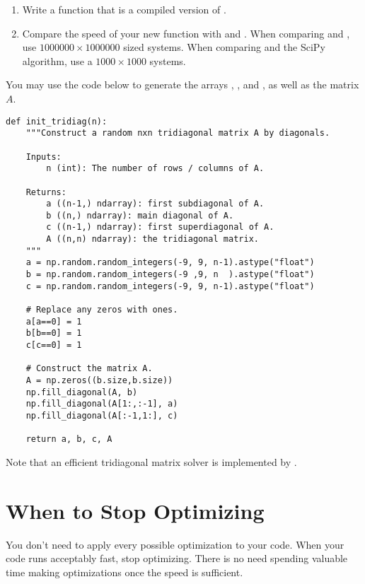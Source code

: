 \begin{problem} \label{prob:tridiag}
\leavevmode
\begin{enumerate}
\item Write a function that is a compiled version of .
\item Compare the speed of your new function with  and .
When comparing  and , use $1000000 \times 1000000$ sized systems.
When comparing  and the SciPy algorithm, use a $1000 \times 1000$ systems.
\end{enumerate}
You may use the code below to generate the arrays , , and , as well as the matrix $A$.

\begin{lstlisting}
def init_tridiag(n):
    """Construct a random nxn tridiagonal matrix A by diagonals.

    Inputs:
        n (int): The number of rows / columns of A.

    Returns:
        a ((n-1,) ndarray): first subdiagonal of A.
        b ((n,) ndarray): main diagonal of A.
        c ((n-1,) ndarray): first superdiagonal of A.
        A ((n,n) ndarray): the tridiagonal matrix.
    """
    a = np.random.random_integers(-9, 9, n-1).astype("float")
    b = np.random.random_integers(-9 ,9, n  ).astype("float")
    c = np.random.random_integers(-9, 9, n-1).astype("float")

    # Replace any zeros with ones.
    a[a==0] = 1
    b[b==0] = 1
    c[c==0] = 1

    # Construct the matrix A.
    A = np.zeros((b.size,b.size))
    np.fill_diagonal(A, b)
    np.fill_diagonal(A[1:,:-1], a)
    np.fill_diagonal(A[:-1,1:], c)

    return a, b, c, A
\end{lstlisting}

Note that an efficient tridiagonal matrix solver is implemented by .
\end{problem}

\section*{When to Stop Optimizing} %

You don't need to apply every possible optimization to your code.
When your code runs acceptably fast, stop optimizing.
There is no need spending valuable time making optimizations once the speed is sufficient.

